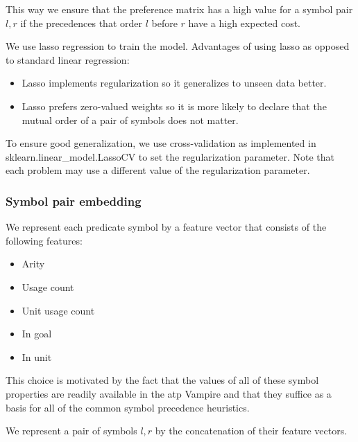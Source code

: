 This way we ensure that the preference matrix has a high value for a symbol pair \(l, r\)
if the precedences that order \(l\) before \(r\) have a high expected cost.

We use lasso regression \cite{?} to train the model.
Advantages of using lasso as opposed to standard linear regression\cite{?}:

\begin{itemize}
	\item Lasso implements regularization so it generalizes to unseen data better.
	\item Lasso prefers zero-valued weights so it is more likely to declare that the mutual order of a pair of symbols does not matter.
\end{itemize}

To ensure good generalization,
we use cross-validation as implemented in sklearn.linear\_model.LassoCV \cite{?}
to set the regularization parameter.
Note that each problem may use a different value of the regularization parameter.

\subsubsection{Symbol pair embedding}

We represent each predicate symbol by a feature vector that consists of the following features:

\begin{itemize}
	\item Arity
	\item Usage count
	\item Unit usage count
	\item In goal
	\item In unit
\end{itemize}

This choice is motivated by the fact that the values of all of these symbol properties
are readily available in the \gls{atp} Vampire
and that they suffice as a basis for all of the common symbol precedence heuristics.

We represent a pair of symbols \(l, r\) by the concatenation of their feature vectors.

